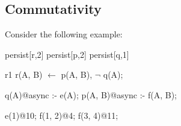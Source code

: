 




\subsection{Commutativity}

Consider the following example:

\begin{Dedalus}
persist[r,2]
persist[p,2]
persist[q,1]

r1
r(A, B) \(\leftarrow\) 
    p(A, B), \(\lnot\) q(A);

q(A)@async :- e(A);
p(A, B)@async :- f(A, B);

e(1)@10;
f(1, 2)@4;
f(3, 4)@11; 
\end{Dedalus} 

